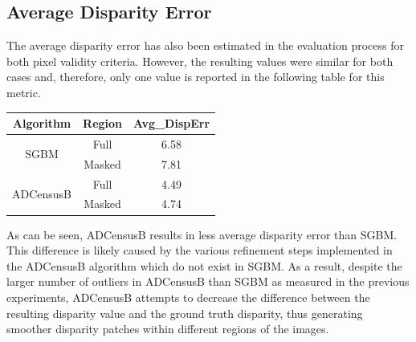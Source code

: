 \subsection{Average Disparity Error}
The average disparity error has also been estimated in the evaluation process for both pixel validity criteria. However, the resulting values
were similar for both cases and, therefore, only one value is reported in the following table for this metric. \newline

\begin{minipage}{\linewidth}
\begin{center}
\label{tab:avgerr}
\begin{tabular}{ |c|c|c| }
\hline
Algorithm & Region & Avg\_DispErr \\ \hline
\multirow{2}{*}{SGBM} & Full & 6.58 \\ \cline{2-3}
& Masked & 7.81 \\ \hline
\multirow{2}{*}{ADCensusB} & Full & 4.49 \\ \cline{2-3}
& Masked & 4.74 \\ \hline
\end{tabular}
\end{center}
\end{minipage} \newline \newline

As can be seen, ADCensusB results in less average disparity error than SGBM. This difference is likely caused by the various refinement steps
implemented in the ADCensusB algorithm which do not exist in SGBM.
As a result, despite the larger number of outliers in ADCensusB than SGBM as measured in the previous experiments,
ADCensusB attempts to decrease the difference between the resulting disparity value and the ground truth disparity, thus generating smoother disparity patches
within different regions of the images.

